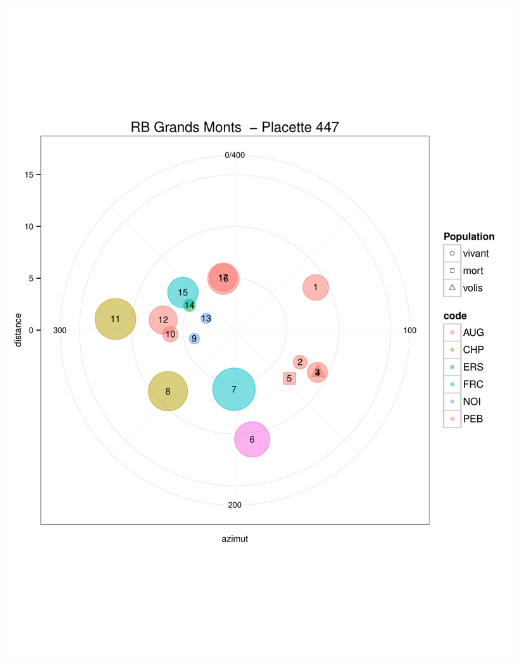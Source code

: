 \documentclass[a4paper]{book}\usepackage[]{graphicx}\usepackage[]{color}
\makeatletter
\def\maxwidth{ %
  \ifdim\Gin@nat@width>\linewidth
    \linewidth
  \else
    \Gin@nat@width
  \fi
}
\newenvironment{knitrout}{}{} %
\makeatother
\begin{document}
\begin{knitrout}
{\centering \includegraphics[width=\maxwidth]{Figures/PlanArbres-47} 

}





\end{knitrout}
\end{document}
